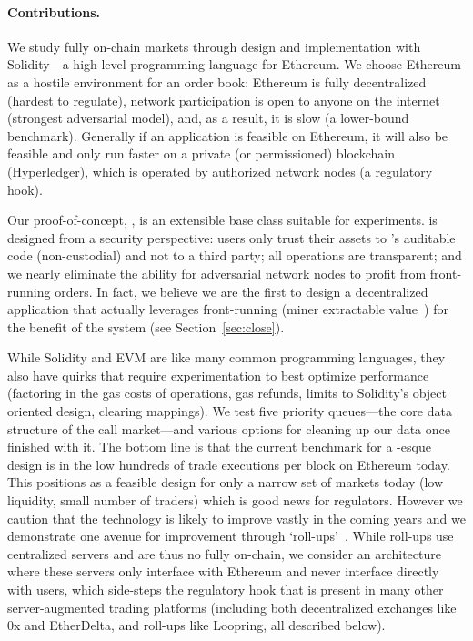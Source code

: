 \paragraph{Contributions.} We study fully on-chain markets through design and implementation with Solidity---a high-level programming language for Ethereum. We choose Ethereum as a hostile environment for an order book: Ethereum is fully decentralized (hardest to regulate), network participation is open to anyone on the internet (strongest adversarial model), and, as a result, it is slow (a lower-bound benchmark). Generally if an application is feasible on Ethereum, it will also be feasible and only run faster on a private (or permissioned) blockchain (\eg Hyperledger), which is operated by authorized network nodes (a regulatory hook). 

Our proof-of-concept, \cm, is an extensible base class suitable for experiments. \cm is designed from a security perspective: users only trust their assets to \cm's auditable code (non-custodial) and not to a third party; all operations are transparent; and we nearly eliminate the ability for adversarial network nodes to profit from front-running orders. In fact, we believe we are the first to design a decentralized application that actually leverages front-running (\ie miner extractable value~\cite{daian2019flash}) for the benefit of the system (see Section~\ref{sec:close}).  

While Solidity and EVM are like many common programming languages, they also have quirks that require experimentation to best optimize performance (\eg factoring in the gas costs of operations, gas refunds, limits to Solidity's object oriented design, clearing mappings). We test five priority queues---the core data structure of the call market---and various options for cleaning up our data once finished with it. The bottom line is that the current benchmark for a \cm-esque design is in the low hundreds of trade executions per block on Ethereum today. This positions \cm as a feasible design for only a narrow set of markets today (low liquidity, small number of traders) which is good news for regulators. However we caution that the technology is likely to improve vastly in the coming years and we demonstrate one avenue for improvement through `roll-ups'~\cite{kalodner2018arbitrum}. While roll-ups use centralized servers and are thus no fully on-chain, we consider an architecture where these servers only interface with Ethereum and never interface directly with users, which side-steps the regulatory hook that is present in many other server-augmented trading platforms (including both decentralized exchanges like 0x and EtherDelta, and roll-ups like Loopring, all described below). 

